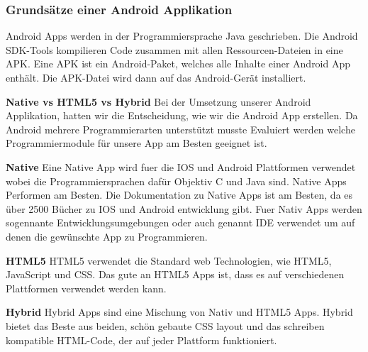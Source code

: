 
\subsubsection{Grundsätze einer Android Applikation}
\label{subsec:aapp-fundam}

Android Apps werden in der Programmiersprache Java geschrieben.
Die Android SDK-Tools kompilieren Code zusammen mit allen Ressourcen-Dateien in eine APK.
Eine APK ist ein Android-Paket, welches alle Inhalte einer Android App enthält. 
Die APK-Datei wird dann auf das Android-Gerät installiert. 


\textbf{Native vs HTML5 vs Hybrid}
Bei der Umsetzung unserer Android Applikation, hatten wir die Entscheidung, wie wir die Android App erstellen. 
Da Android mehrere Programmierarten unterstützt musste Evaluiert werden welche Programmiermodule für unsere App am Besten geeignet ist. \nextline

\textbf{Native\newline} 
Eine Native App wird fuer die IOS und Android Plattformen verwendet wobei die Programmiersprachen dafür Objektiv C und Java sind.
Native Apps Performen am Besten.
Die Dokumentation zu Native Apps ist am Besten, da es über 2500 Bücher zu IOS und Android entwicklung gibt.
Fuer Nativ Apps werden sogennante Entwicklungsumgebungen oder auch genannt IDE verwendet um auf denen die gewünschte App zu Programmieren.\nextline

\textbf{HTML5\newline} 
HTML5 verwendet die Standard web Technologien, wie HTML5, JavaScript und CSS. Das gute an HTML5 Apps ist, dass es auf verschiedenen Plattformen verwendet werden kann.\nextline

\textbf{Hybrid\newline} 
Hybrid Apps sind eine Mischung von Nativ und HTML5 Apps. Hybrid bietet das Beste aus beiden, schön gebaute CSS layout und das schreiben kompatible HTML-Code, der auf jeder Plattform funktioniert.\nextline

\clearpage %